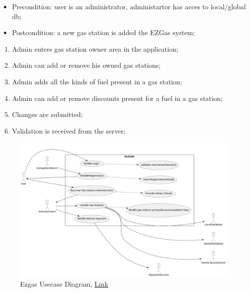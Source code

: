 \documentclass[12pt]{article}
\begin{document}
\begin{itemize}
    \begin{itemize}
      \item Precondition: user is an administrator, administartor has acces to local/global db;
      \item Postcondition: a new gas station is added the EZGas system;
    \end{itemize}
    \begin{enumerate}
      \item Admin enters gas station owner area in the application;
      \item Admin can add or remove his owned gas stations;
      \item Admin adds all the kinds of fuel present in a gas station;
      \item Admin can add or remove discounts present for a fuel in a gas station;
      \item Changes are submitted;
      \item Validation is received from the server;
    \end{enumerate}
\end{itemize}
\begin{figure}[H]
  \centering
  \includegraphics[width=1\textwidth]{ezgas-usecase-diagram.png}
  \caption{Ezgas Usecase Diagram, \href{http://www.plantuml.com/plantuml/uml/PP31Rjim38RlVWgXzpGlC1JTKA0Ri6B1WkvEMun3G9O2ad9X37ltIQnS9-WXWSdl9_NpVnG5rZo5Bk19dIR7D9xLUM8Sb5BiEXWqiNkDZ2E98ljNGHO7ud9ki7QiqUglVg9On0oQ3403pvX26g0kFYwYE5KuIgC7M2QCUaIUQS2ABYlwMQR24oZq84Q2xzUT8VMtR2oiw-e14CU0hZtrj-kou515to7wWB_j8ZOxTUxC7u8VKP3rMl242XJiRcA_hRfxtrKSZXJlAhQlZV-1G1uKBQK84-uF8FAMs9jwRlXgupSSqeJkkT2ZskEtYThS26BDRUp0QIQFxjTRH7RDhscJH_ti-2L53SkQkWali7pINVim4KNPD2_9qscfRfmqhnUc0MNlIOQKe-vX1WhGbqsdZCtHb4g4_yfRsUrs3pNvCxlx-mVBDhilkrtj5LvnIzJ-JRHcPhm8jZ3QXydQsM3RLb1gMscNbh_tGbhRRYi_6pUFjR0dWk-tOhmff7l4wFCK_WC0}{Link} }
  \label{fig:ezgas-usecase-diagram}
\end{figure}
\end{document}
